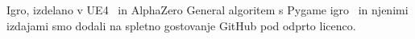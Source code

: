 \documentclass[a4paper, 12pt]{book}
\begin{document}
Igro, izdelano v UE4~\cite{td2020} in AlphaZero General algoritem s Pygame igro~\cite{pygameAlphaZeroGeneral} in njenimi izdajami smo dodali na spletno gostovanje GitHub pod odprto licenco.

\newpage %
\ \\
\clearpage
{}


\end{document}
